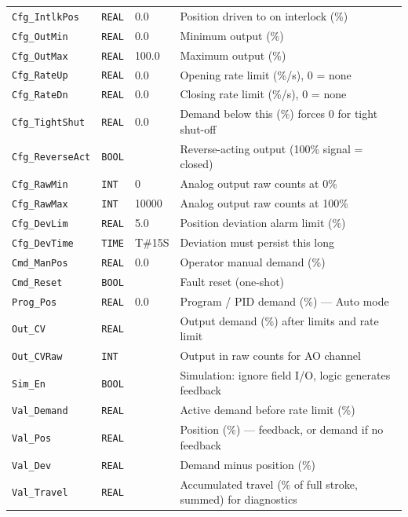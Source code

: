 \begin{small}
\begin{longtable}{@{}P{3.70cm}P{2.20cm}P{1.70cm}P{8.91cm}@{}}
\texttt{Cfg\_IntlkPos} & \texttt{REAL} & 0.0 & Position driven to on interlock (\%) \\
\texttt{Cfg\_OutMin} & \texttt{REAL} & 0.0 & Minimum output (\%) \\
\texttt{Cfg\_OutMax} & \texttt{REAL} & 100.0 & Maximum output (\%) \\
\texttt{Cfg\_RateUp} & \texttt{REAL} & 0.0 & Opening rate limit (\%/\allowbreak{}s), 0 = none \\
\texttt{Cfg\_RateDn} & \texttt{REAL} & 0.0 & Closing rate limit (\%/\allowbreak{}s), 0 = none \\
\texttt{Cfg\_TightShut} & \texttt{REAL} & 0.0 & Demand below this (\%) forces 0 for tight shut-off \\
\texttt{Cfg\_ReverseAct} & \texttt{BOOL} &  & Reverse-acting output (100\% signal = closed) \\
\texttt{Cfg\_RawMin} & \texttt{INT} & 0 & Analog output raw counts at 0\% \\
\texttt{Cfg\_RawMax} & \texttt{INT} & 10000 & Analog output raw counts at 100\% \\
\texttt{Cfg\_DevLim} & \texttt{REAL} & 5.0 & Position deviation alarm limit (\%) \\
\texttt{Cfg\_DevTime} & \texttt{TIME} & T\#15S & Deviation must persist this long \\
\texttt{Cmd\_ManPos} & \texttt{REAL} & 0.0 & Operator manual demand (\%) \\
\texttt{Cmd\_Reset} & \texttt{BOOL} &  & Fault reset (one-shot) \\
\texttt{Prog\_Pos} & \texttt{REAL} & 0.0 & Program /\allowbreak{} PID demand (\%) --- Auto mode \\
\texttt{Out\_CV} & \texttt{REAL} &  & Output demand (\%) after limits and rate limit \\
\texttt{Out\_CVRaw} & \texttt{INT} &  & Output in raw counts for AO channel \\
\texttt{Sim\_En} & \texttt{BOOL} &  & Simulation: ignore field I/\allowbreak{}O, logic generates feedback \\
\texttt{Val\_Demand} & \texttt{REAL} &  & Active demand before rate limit (\%) \\
\texttt{Val\_Pos} & \texttt{REAL} &  & Position (\%) --- feedback, or demand if no feedback \\
\texttt{Val\_Dev} & \texttt{REAL} &  & Demand minus position (\%) \\
\texttt{Val\_Travel} & \texttt{REAL} &  & Accumulated travel (\% of full stroke, summed) for diagnostics \\

\end{longtable}
\end{small}
